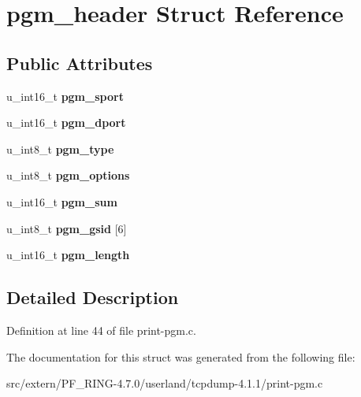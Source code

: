 \hypertarget{structpgm__header}{
\section{pgm\_\-header Struct Reference}
\label{structpgm__header}
}
\subsection*{Public Attributes}
\begin{DoxyCompactItemize}
\item 
\hypertarget{structpgm__header_a0021caf2fe6e7319d84acb3c308fe792}{
u\_\-int16\_\-t {\bfseries pgm\_\-sport}}
\label{structpgm__header_a0021caf2fe6e7319d84acb3c308fe792}

\item 
\hypertarget{structpgm__header_a926e8f29aad84261922d9fd6a6d83100}{
u\_\-int16\_\-t {\bfseries pgm\_\-dport}}
\label{structpgm__header_a926e8f29aad84261922d9fd6a6d83100}

\item 
\hypertarget{structpgm__header_a6752b86151c1fc9d8f1ff961e33174ec}{
u\_\-int8\_\-t {\bfseries pgm\_\-type}}
\label{structpgm__header_a6752b86151c1fc9d8f1ff961e33174ec}

\item 
\hypertarget{structpgm__header_a376135bb4009429df11cbcaff79ca2c7}{
u\_\-int8\_\-t {\bfseries pgm\_\-options}}
\label{structpgm__header_a376135bb4009429df11cbcaff79ca2c7}

\item 
\hypertarget{structpgm__header_ab8948b197c833b985e9d235c63a5f7ff}{
u\_\-int16\_\-t {\bfseries pgm\_\-sum}}
\label{structpgm__header_ab8948b197c833b985e9d235c63a5f7ff}

\item 
\hypertarget{structpgm__header_a0ff30c7221d9c512e0c37c645e76c91d}{
u\_\-int8\_\-t {\bfseries pgm\_\-gsid} \mbox{[}6\mbox{]}}
\label{structpgm__header_a0ff30c7221d9c512e0c37c645e76c91d}

\item 
\hypertarget{structpgm__header_ab89a695350e368920a5cfaa570613448}{
u\_\-int16\_\-t {\bfseries pgm\_\-length}}
\label{structpgm__header_ab89a695350e368920a5cfaa570613448}

\end{DoxyCompactItemize}


\subsection{Detailed Description}


Definition at line 44 of file print-\/pgm.c.



The documentation for this struct was generated from the following file:\begin{DoxyCompactItemize}
\item 
src/extern/PF\_\-RING-\/4.7.0/userland/tcpdump-\/4.1.1/print-\/pgm.c\end{DoxyCompactItemize}
